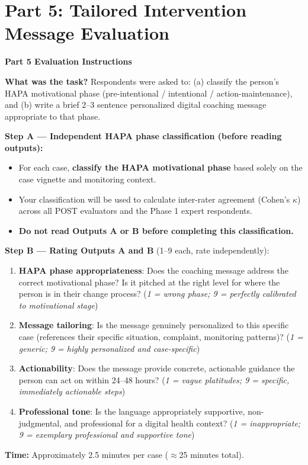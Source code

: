 \documentclass[11pt,a4paper]{article}
\begin{document}
\newpage

\section{Part 5: Tailored Intervention Message Evaluation}
\label{sec:part5}

\begin{tcolorbox}[colback=PartFiveBG,colframe=RichPurple,arc=2.5mm,boxrule=0.9pt,left=10pt,right=10pt,top=9pt,bottom=9pt]
\textbf{\color{RichPurple}Part 5 Evaluation Instructions}

\smallskip
\textbf{What was the task?} Respondents were asked to: (a) classify the person's HAPA motivational phase (pre-intentional / intentional / action-maintenance), and (b) write a brief 2--3 sentence personalized digital coaching message appropriate to that phase.

\textbf{Step A --- Independent HAPA phase classification (before reading outputs):}
\begin{itemize}
\item For each case, \textbf{classify the HAPA motivational phase} based solely on the case vignette and monitoring context.
\item Your classification will be used to calculate inter-rater agreement (Cohen's $\kappa$) across all POST evaluators and the Phase 1 expert respondents.
\item \textbf{Do not read Outputs A or B before completing this classification.}
\end{itemize}

\textbf{Step B --- Rating Outputs A and B} (1--9 each, rate independently):
\begin{enumerate}
\item \textbf{HAPA phase appropriateness}: Does the coaching message address the correct motivational phase? Is it pitched at the right level for where the person is in their change process? (\textit{1 = wrong phase; 9 = perfectly calibrated to motivational stage})
\item \textbf{Message tailoring}: Is the message genuinely personalized to this specific case (references their specific situation, complaint, monitoring patterns)? (\textit{1 = generic; 9 = highly personalized and case-specific})
\item \textbf{Actionability}: Does the message provide concrete, actionable guidance the person can act on within 24--48 hours? (\textit{1 = vague platitudes; 9 = specific, immediately actionable steps})
\item \textbf{Professional tone}: Is the language appropriately supportive, non-judgmental, and professional for a digital health context? (\textit{1 = inappropriate; 9 = exemplary professional and supportive tone})
\end{enumerate}

\textbf{Time:} Approximately 2.5 minutes per case ($\approx$25 minutes total).
\end{tcolorbox}
\end{document}
